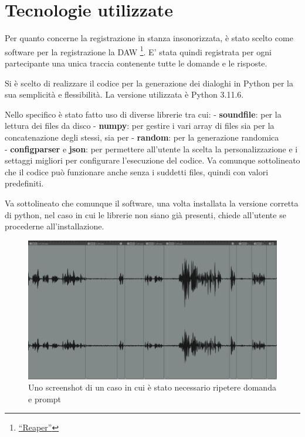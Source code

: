 \documentclass[
]{article}
\begin{document}
\section{Tecnologie utilizzate}\label{tecnologie-utilizzate}

Per quanto concerne la registrazione in stanza insonorizzata, è stato scelto come software per la registrazione la DAW \footnote{\href{https://www.reaper.fm/}{``Reaper''}}. E' stata quindi registrata per ogni partecipante una unica traccia contenente tutte le domande e le risposte.

Si è scelto di realizzare il codice per la generazione dei dialoghi in Python per la sua semplicità e flessibilità. La versione utilizzata è Python 3.11.6.

Nello specifico è stato fatto uso di diverse librerie tra cui: - \textbf{soundfile}: per la lettura dei files da disco - \textbf{numpy}: per gestire i vari array di files sia per la concatenazione degli stessi, sia per - \textbf{random}: per la generazione randomica\\
- \textbf{configparser} e \textbf{json}: per permettere all'utente la scelta la personalizzazione e i settaggi migliori per configurare l'esecuzione del codice. Va comunque sottolineato che il codice può funzionare anche senza i suddetti files, quindi con valori predefiniti.

Va sottolineato che comunque il software, una volta installata la versione corretta di python, nel caso in cui le librerie non siano già presenti, chiede all'utente se procederne all'installazione.

\begin{figure}
\centering
\includegraphics{img/1.jpg}
\caption{Uno screenshot di un caso in cui è stato necessario ripetere domanda e prompt}
\end{figure}
\end{document}
